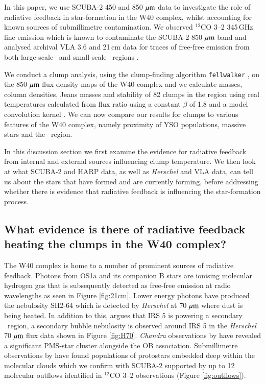 In this paper, we use SCUBA-2 450 and 850\,$\,\mu\rm{m}$ data to investigate the role of 
radiative feedback in star-formation in the W40 complex, whilst accounting for known 
sources of submillimetre contamination. We observed $^{12}\textrm{CO}$ 3\hbox{--}2 
345\,GHz line emission which is known to contaminate the SCUBA-2 850\,$\,\mu\rm{m}$ 
band \citep{Drabek:2012uq} and analysed archival VLA 3.6 \citep{Rodriguez:2010bs} 
and 21\,cm \citep{Condon:1998kx} data for traces of free-free emission \citep{Olnon:1975bh} 
from both large-scale \HII\ and small-scale \UCHII\ regions .

We conduct a clump analysis, using the clump-finding algorithm \texttt{fellwalker} 
\citep{Berry:2014vn}, on the 850\,$\,\mu\rm{m}$ flux density maps of the W40 complex 
and we calculate masses, column densities, Jeans masses and stability of 82 clumps 
in the region using real temperatures calculated from flux ratio using a constant $\beta$ 
of 1.8 and a model convolution kernel \citep{Aniano:2011fk, Pattle:2015ys}. We can now 
compare our results for clumps to various features of the W40 complex, namely proximity 
of YSO populations, massive stars and the \HII\ region. 

In this discussion section we first examine the evidence for radiative feedback from 
internal and external sources influencing clump temperature. We then look at what 
SCUBA-2 and HARP data, as well as \emph{Herschel} and VLA data, can tell us about 
the stars that have formed and are currently forming, before addressing whether there 
is evidence that radiative feedback is influencing the star-formation process.  

\subsection{What evidence is there of radiative feedback heating the clumps in the W40 complex?}

The W40 complex is home to a number of prominent sources of radiative feedback. Photons 
from OS1a and its companion B stars are ionising molecular hydrogen gas that is subsequently 
detected as free-free emission at radio wavelengths as seen in Figure \ref{fig:21cm}. Lower 
energy photons have produced the nebulosity SH2-64 which is detected by \emph{Herschel} at 
70\,$\,\mu\rm{m}$ where dust is being heated. In addition to this, \cite{Pirogov:2013ys} argues that 
IRS 5 is powering a secondary \HII\ region, a secondary bubble nebulosity is observed around 
IRS 5 in the \emph{Herschel} 70\,$\,\mu\rm{m}$ flux data shown in Figure \ref{fig:H70}. \emph{Chandra} 
observations by \cite{Kuhn:2010kl} have revealed a significant PMS-star cluster alongside the OB 
association. Submillimetre observations by \cite{Maury:2011ys} have found populations of 
protostars embedded deep within the molecular clouds which we confirm with SCUBA-2 
supported by up to 12 molecular outflows identified in $^{12}$CO 3\hbox{--}2 observations (Figure 
\ref{fig:outflows}).

